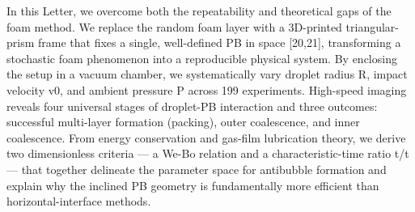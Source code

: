 In this Letter, we overcome both the repeatability and theoretical gaps of the foam method. We replace the random foam layer with a 3D-printed triangular-prism frame that fixes a single, well-defined PB in space [20,21], transforming a stochastic foam phenomenon into a reproducible physical system. By enclosing the setup in a vacuum chamber, we systematically vary droplet radius R, impact velocity v0, and ambient pressure P across 199 experiments. High-speed imaging reveals four universal stages of droplet-PB interaction and three outcomes: successful multi-layer formation (packing), outer coalescence, and inner coalescence. From energy conservation and gas-film lubrication theory, we derive two dimensionless criteria — a We-Bo relation and a characteristic-time ratio t/t — that together delineate the parameter space for antibubble formation and explain why the inclined PB geometry is fundamentally more efficient than horizontal-interface methods.
